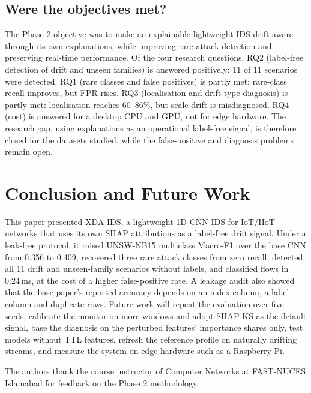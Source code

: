 \documentclass[pdflatex,sn-mathphys-num]{sn-jnl}%
\begin{document}
\subsection{Were the objectives met?}
The Phase 2 objective was to make an explainable lightweight IDS drift-aware through its own explanations, while improving rare-attack detection and preserving real-time performance. Of the four research questions, RQ2 (label-free detection of drift and unseen families) is answered positively: 11 of 11 scenarios were detected. RQ1 (rare classes and false positives) is partly met: rare-class recall improves, but FPR rises. RQ3 (localisation and drift-type diagnosis) is partly met: localisation reaches 60--86\%, but scale drift is misdiagnosed. RQ4 (cost) is answered for a desktop CPU and GPU, not for edge hardware. The research gap, using explanations as an operational label-free signal, is therefore closed for the datasets studied, while the false-positive and diagnosis problems remain open.

\section{Conclusion and Future Work}\label{sec:conclusion}
This paper presented XDA-IDS, a lightweight 1D-CNN IDS for IoT/IIoT networks that uses its own SHAP attributions as a label-free drift signal. Under a leak-free protocol, it raised UNSW-NB15 multiclass Macro-F1 over the base CNN from 0.356 to 0.409, recovered three rare attack classes from zero recall, detected all 11 drift and unseen-family scenarios without labels, and classified flows in 0.24\,ms, at the cost of a higher false-positive rate. A leakage audit also showed that the base paper's reported accuracy depends on an index column, a label column and duplicate rows. Future work will repeat the evaluation over five seeds, calibrate the monitor on more windows and adopt SHAP KS as the default signal, base the diagnosis on the perturbed features' importance shares only, test models without TTL features, refresh the reference profile on naturally drifting streams, and measure the system on edge hardware such as a Raspberry Pi.

\backmatter

The authors thank the course instructor of Computer Networks at FAST-NUCES Islamabad for feedback on the Phase 2 methodology.
\end{document}
